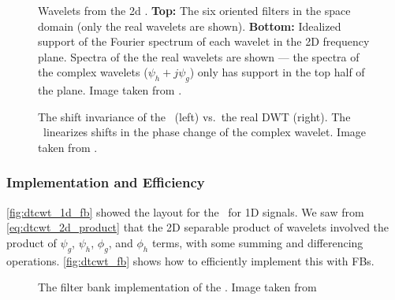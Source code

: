   \begin{figure}
    \centering
      \caption[Wavelets from the 2D \DTCWT]
              {Wavelets from the 2d \DTCWT\@. \textbf{Top:} The six  oriented filters
      in the space domain (only the real wavelets are shown). \textbf{Bottom:}
      Idealized support of the Fourier spectrum of each wavelet in the 2D
      frequency plane. Spectra of the the real wavelets are shown --- the
      spectra of the complex wavelets ($\psi_h + j\psi_g$) only has support in the top
      half of the plane. Image taken from \citep{selesnick_dual-tree_2005}.}
      \label{fig:dtcwt_wavelets}
  \end{figure}
  \begin{figure}
    \centering
      \makebox[\textwidth][c]{%
      }
      \caption[The shift invariance ofthe \DTCWT\ vs.\ the real DWT]
              {The shift invariance of the \DTCWT\ (left) vs.\ the real DWT
              (right). The \DTCWT\ linearizes shifts in the phase change of the complex
              wavelet. Image taken from \citep{kingsbury_dual-tree_1998}.}
      \label{fig:dtcwt_shift_invariance}
  \end{figure}

\subsubsection{Implementation and Efficiency}\label{sec:dtcwt_efficiency}
  \autoref{fig:dtcwt_1d_fb} showed the layout for the \DTCWT\ for 1D signals. We
  saw from \autoref{eq:dtcwt_2d_product} that the 2D separable product of wavelets
  involved the product of $\psi_g$, $\psi_h$, $\phi_g$, and $\phi_h$ terms, with
  some summing and differencing operations. \autoref{fig:dtcwt_fb} shows how to
  efficiently implement this with FBs.
  
  \begin{figure}
    \centering
    \makebox[\textwidth][c]{%
    }
      \caption[The filter bank implementation of the \DTCWT]
              {The filter bank implementation of the \DTCWT\@. Image taken from 
              \citep{kingsbury_image_1999}}
      \label{fig:dtcwt_fb}
  \end{figure}

